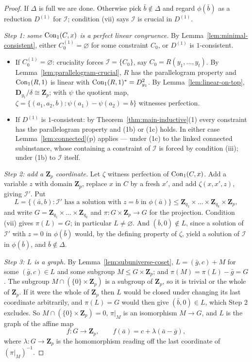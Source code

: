 \begin{proof}[Proof]
If $\Delta$ is full we are done. Otherwise pick $\bar b\notin\Delta$ and regard
$\phi(\bar b)$ as a reduction $D^{(1)}$ for $\mathcal I$; condition (vii) says
$\mathcal I$ is crucial in $D^{(1)}$.

\emph{Step 1: some $\operatorname{Con}_1(C,x)$ is a perfect linear congruence.} By
Lemma~\ref{lem:minimal-consistent}, either $C_{0}^{(1)}=\varnothing$ for some
constraint $C_{0}$, or $D^{(1)}$ is $1$-consistent.
\begin{itemize}\tightlist
\item If $C_{0}^{(1)}=\varnothing$: cruciality forces $\mathcal I=\{C_{0}\}$,
  say $C_{0}=R(y_{1},\dots,y_{t})$. By
  Lemma~\ref{lem:parallelogram-crucial}, $R$ has the parallelogram property and
  $\operatorname{Con}_1(R,1)$ is linear with $\operatorname{Con}_1(R,1)^{*}=D_{y_{1}}^{2}$. By
  Lemma~\ref{lem:linear-on-top}, $\mathbf D_{y_{1}}/\delta\cong\mathbf Z_{p}$;
  with $\psi$ the quotient map, $\zeta=\{(a_{1},a_{2},b):\psi(a_{1})-\psi(a_{2})=b\}$
  witnesses perfection.
\item If $D^{(1)}$ is $1$-consistent: by Theorem~\ref{thm:main-inductive}(1)
  every constraint has the parallelogram property and (1b) or (1c) holds. In
  either case Lemma~\ref{lem:connected}(p) applies --- under (1c) to the
  linked connected subinstance, whose containing a constraint of $\mathcal I$
  is forced by condition (iii); under (1b) to $\mathcal I$ itself.
\end{itemize}

\emph{Step 2: add a $\mathbf Z_{p}$ coordinate.} Let $\zeta$ witness
perfection of $\operatorname{Con}_1(C,x)$. Add a variable $z$ with domain $\mathbf Z_{p}$,
replace $x$ in $C$ by a fresh $x'$, and add $\zeta(x,x',z)$, giving
$\mathcal I'$. Put
\[
  L=\{(\bar a,b):\mathcal I'\text{ has a solution with }z=b\text{ in }\phi(\bar a)\}
   \le\mathbf Z_{q_{1}}\times\dots\times\mathbf Z_{q_{k}}\times\mathbf Z_{p},
\]
and write $G=\mathbf Z_{q_{1}}\times\dots\times\mathbf Z_{q_{k}}$ and
$\pi\colon G\times\mathbf Z_{p}\to G$ for the projection. Condition (vii) gives
$\pi(L)=G$; in particular $L\neq\varnothing$. And $(\bar b,0)\notin L$, since a
solution of $\mathcal I'$ with $z=0$ in $\phi(\bar b)$ would, by the defining
property of $\zeta$, yield a solution of $\mathcal I$ in $\phi(\bar b)$, and
$\bar b\notin\Delta$.

\emph{Step 3: $L$ is a graph.} By Lemma~\ref{lem:subuniverse-coset},
$L=(\bar g,c)+M$ for some $(\bar g,c)\in L$ and some subgroup $M\le
G\times\mathbf Z_{p}$; and $\pi(M)=\pi(L)-\bar g=G$. The subgroup
$M\cap(\{0\}\times\mathbf Z_{p})$ is a subgroup of $\mathbf Z_{p}$, so it is
trivial or the whole of $\mathbf Z_{p}$. If it were the whole of
$\mathbf Z_{p}$ then $L$ would be closed under changing its last coordinate
arbitrarily, and $\pi(L)=G$ would then give $(\bar b,0)\in L$, which Step 2
excludes. So $M\cap(\{0\}\times\mathbf Z_{p})=0$, $\pi|_{M}$ is an isomorphism
$M\to G$, and $L$ is the graph of the affine map
\[
  f\colon G\to\mathbf Z_{p},\qquad
  f(\bar a)=c+\lambda(\bar a-\bar g),
\]
where $\lambda\colon G\to\mathbf Z_{p}$ is the homomorphism reading off the last
coordinate of $(\pi|_{M})^{-1}$.


\end{proof}
